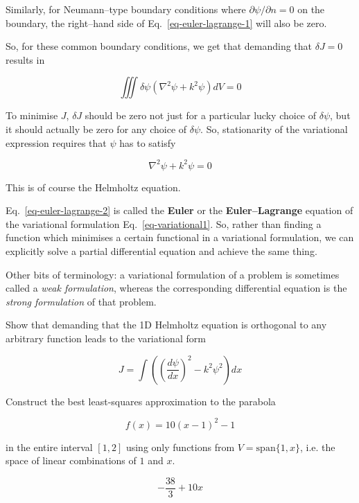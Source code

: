 Similarly, for Neumann--type boundary conditions where $\partial \psi / \partial n = 0$ on the boundary, the right--hand side of Eq.~\ref{eq-euler-lagrange-1} will also be zero.

So, for these common boundary conditions, we get that demanding that $\delta J = 0$ results in

\begin{equation}
\iiint \delta \psi (\nabla^2 \psi + k^2 \psi ) dV = 0
\end{equation} 

To minimise $J$, $\delta J$ should be zero not just for a particular lucky choice of $\delta \psi$, but it should actually be zero for any choice of $\delta \psi$. So, stationarity of the variational expression requires that $\psi$ has to satisfy

\begin{equation}
\nabla^2 \psi + k^2 \psi = 0 \label{eq-euler-lagrange-2}
\end{equation} 

This is of course the Helmholtz equation.

Eq.~\ref{eq-euler-lagrange-2} is called the \textbf{Euler} or the \textbf{Euler--Lagrange} equation of the variational formulation Eq.~\ref{eq-variational1}. So, rather than finding a function which minimises a certain functional in a variational formulation, we can explicitly solve a partial differential equation and achieve the same thing.

Other bits of terminology: a variational formulation of a problem is sometimes called a \emph{weak formulation}, whereas the corresponding differential equation is the \emph{strong formulation} of that problem.

\pagebreak

\begin{exer}
Show that demanding that the 1D Helmholtz equation is orthogonal to any arbitrary function leads to the variational form 

$$J = \int \left( \left(\frac{d \psi}{d x}\right)^2 - k^2 \psi^2 \right) dx$$

\end{exer}


\begin{exer}
  
Construct the best least-squares approximation to the parabola 

$$f(x) = 10(x-1)^2 -1$$ 

in the entire interval $[1,2]$ using only functions from $V = \mathrm{span} \{1, x\}$, i.e. the space of linear combinations of $1$ and $x$.

\begin{sol}
$$-\frac{38}{3} + 10x$$   
\end{sol}
\end{exer}


